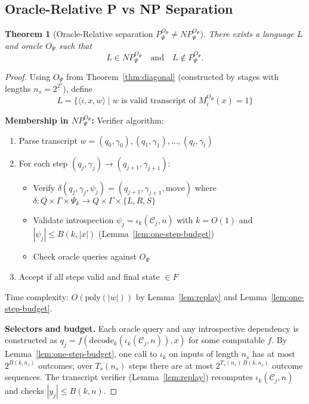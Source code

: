 \documentclass[11pt]{article}
\newtheorem{theorem}{Theorem}[section]
\theoremstyle{definition}
\newcommand{\len}[1]{\left|#1\right|}
\begin{document}
\subsection{Oracle-Relative P vs NP Separation}

\begin{theorem}[Oracle-Relative separation $P^{O_\Psi}_\Psi \ne NP^{O_\Psi}_\Psi$]
\label{thm:separation}
There exists a language $L$ and oracle $O_\Psi$ such that
\[
L \in NP^{O_\Psi}_\Psi \quad\text{and}\quad L \notin P^{O_\Psi}_\Psi.
\]
\end{theorem}

\begin{proof}
Using $O_\Psi$ from Theorem~\ref{thm:diagonal} (constructed by stages with lengths $n_s=2^{2^s}$), define
$$L = \{\langle i, x, w \rangle \mid w \text{ is valid transcript of } M_i^{O_\Psi}(x) = 1\}$$

\textbf{Membership in $NP^{O_\Psi}_\Psi$:}
Verifier algorithm:
\begin{enumerate}
\item Parse transcript $w = (q_0, \gamma_0), (q_1, \gamma_1), \ldots, (q_t, \gamma_t)$
\item For each step $(q_j, \gamma_j) \to (q_{j+1}, \gamma_{j+1})$:
   \begin{itemize}
   \item Verify $\delta(q_j, \gamma_j, \psi_j) = (q_{j+1}, \gamma_{j+1}, \text{move})$ where \\
$\delta: Q \times \Gamma \times \Psi_k \to Q \times \Gamma \times \{L, R, S\}$
\item Validate introspection $\psi_j = \iota_k(\mathcal{C}_j, n)$ with $k = O(1)$ and $|\psi_j|\le B(k,\len{x})$ (Lemma~\ref{lem:one-step-budget})
   \item Check oracle queries against $O_\Psi$
   \end{itemize}
\item Accept if all steps valid and final state $\in F$
\end{enumerate}
Time complexity: $O(\mathrm{poly}(|w|))$ by Lemma~\ref{lem:replay} and Lemma~\ref{lem:one-step-budget}.

\noindent\textbf{Selectors and budget.} Each oracle query and any introspective dependency is constructed as $q_j = f(\mathrm{decode}_k(\iota_k(\mathcal{C}_j,n)), x)$ for some computable $f$. By Lemma~\ref{lem:one-step-budget}, one call to $\iota_k$ on inputs of length $n_s$ has at most $2^{B(k,n_s)}$ outcomes; over $T_s(n_s)$ steps there are at most $2^{T_s(n_s)\,B(k,n_s)}$ outcome sequences. The transcript verifier (Lemma~\ref{lem:replay}) recomputes $\iota_k(\mathcal{C}_j,n)$ and checks $|y_j|\le B(k,n)$.


\end{proof}
\end{document}
